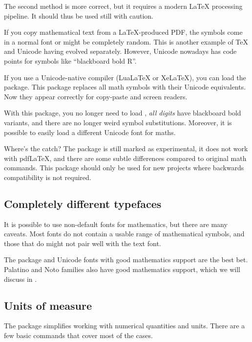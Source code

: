 The second method is more correct,
but it requires a modern \LaTeX{} processing pipeline.
It should thus be used still with caution.

\begin{latexthree}\label{rem:math unicode}
If you copy mathematical text from a \LaTeX-produced PDF,
the symbols come in a normal font or might be completely random.
This is another example of \TeX{} and Unicode having evolved separately.
However, Unicode nowadays has code points for symbols like ``blackboard bold R''.

If you use a Unicode-native compiler (LuaLaTeX or XeLaTeX),
you can load the  package.
This package replaces all math symbols with their Unicode equivalents.
Now they appear correctly for copy-paste and screen readers.

With this package, you no longer need to load ,
\emph{all digits} have blackboard bold variants,
and there are no longer weird symbol substitutions.
Moreover, it is possible to easily load a different Unicode font for maths.

Where's the catch?
The package is still marked as experimental,
it does not work with pdfLaTeX,
and there are some subtle differences compared to original math commands.
This package should only be used for new projects where backwards compatibility is not required.
\end{latexthree}


%
%
\subsection{Completely different typefaces}

It is possible to use non-default fonts for mathematics,
but there are many caveats.
Most fonts do not contain a usable range of mathematical symbols,
and those that do might not pair well with the text font.

The  package and Unicode fonts with good mathematics support are the best bet.
Palatino and Noto families also have good mathematics support,
which we will discuss in .


%
%
\subsection{Units of measure}

The  package simplifies working with numerical quantities and units.
There are a few basic commands that cover most of the cases.

